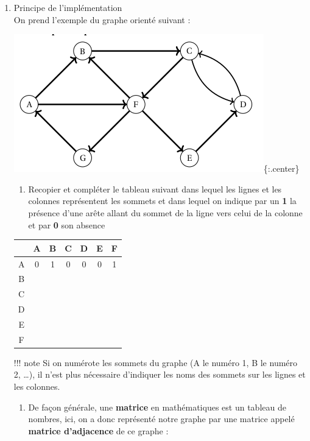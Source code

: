 \documentclass[
  letterpaper,
  DIV=11,
  numbers=noendperiod]{scrartcl}
\providecommand{\tightlist}{%
  \setlength{\itemsep}{0pt}\setlength{\parskip}{0pt}}\usepackage{longtable,booktabs,array}
\begin{document}
\begin{enumerate}
\def\labelenumi{\arabic{enumi}.}
\item
  Principe de l'implémentation\\
  On prend l'exemple du graphe orienté suivant :

  \includegraphics{data/graphe21.png}\{:.center\}

  \begin{enumerate}
  \def\labelenumii{\alph{enumii}.}
  \tightlist
  \item
    Recopier et compléter le tableau suivant dans lequel les lignes et
    les colonnes représentent les sommets et dans lequel on indique par
    un \textbf{1} la présence d'une arête allant du sommet de la ligne
    vers celui de la colonne et par \textbf{0} son absence
  \end{enumerate}

  \begin{longtable}[]{@{}ccccccc@{}}
  \toprule\noalign{}
  & A & B & C & D & E & F \\
  \midrule\noalign{}
  \endhead
  \bottomrule\noalign{}
  \endlastfoot
  A & 0 & 1 & 0 & 0 & 0 & 1 \\
  B & & & & & & \\
  C & & & & & & \\
  D & & & & & & \\
  E & & & & & & \\
  F & & & & & & \\
  \end{longtable}

  !!! note Si on numérote les sommets du graphe (A le numéro 1, B le
  numéro 2, \ldots), il n'est plus nécessaire d'indiquer les noms des
  sommets sur les lignes et les colonnes.

  \begin{enumerate}
  \def\labelenumii{\alph{enumii}.}
  \setcounter{enumii}{1}
  \tightlist
  \item
    De façon générale, une \textbf{matrice} en mathématiques est un
    tableau de nombres, ici, on a donc représenté notre graphe par une
    matrice appelé \textbf{matrice d'adjacence} de ce graphe :
  \end{enumerate}


\end{enumerate}
\end{document}
